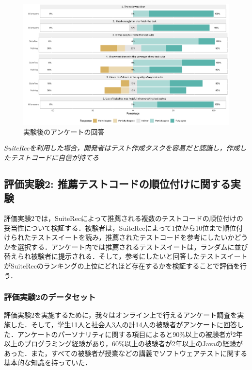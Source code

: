 \documentclass[12pt]{jarticle} %
\begin{document}
\begin{figure}[htbp]
  \begin{center}
   \includegraphics[width=15cm]{suiterec-expt.pdf}
  \caption{実験後のアンケートの回答}
  \label{QA}
  \end{center}
\end{figure}

\begin{breakbox}
\textit{{\sf SuiteRec}を利用した場合，開発者はテスト作成タスクを容易だと認識し，作成したテストコードに自信が持てる}
\end{breakbox}

\subsection{評価実験2: 推薦テストコードの順位付けに関する実験}
評価実験2では，{\sf SuiteRec}によって推薦される複数のテストコードの順位付けの妥当性について検証する．被験者は，{\sf SuiteRec}によって1位から10位まで順位付けられたテストスイートを読み，推薦されたテストコードを参考にしたいかどうかを選択する．アンケート内では推薦されるテストスイートは，ランダムに並び替えられ被験者に提示される．そして，参考にしたいと回答したテストスイートが{\sf SuiteRec}のランキングの上位にどれほど存在するかを検証することで評価を行う．
\subsubsection{評価実験2のデータセット}

評価実験2を実施するために，我々はオンライン上で行えるアンケート調査を実施した．そして，学生11人と社会人3人の計14人の被験者がアンケートに回答した．アンケートのパーソナリティに関する項目によると90\%以上の被験者が2年以上のプログラミング経験があり，60\%以上の被験者が2年以上のJavaの経験があった．また，すべての被験者が授業などの講義でソフトウェアテストに関する基本的な知識を持っていた．
\end{document}
